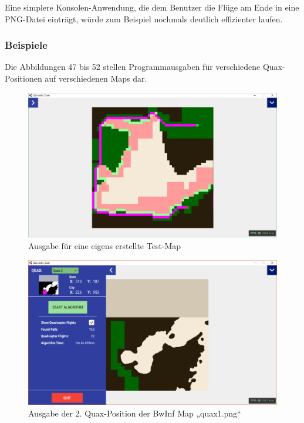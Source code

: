 \documentclass[a4paper,12pt]{article}
\begin{document}
Eine simplere Konsolen-Anwendung, die dem Benutzer die Flüge am Ende in eine PNG-Datei einträgt, würde zum Beispiel nochmals deutlich effizienter laufen.


\subsubsection{Beispiele}
Die Abbildungen 47 bis 52 stellen Programmausgaben für verschiedene Quax-Positionen auf verschiedenen Maps dar.
\begin{figure}[H]
\centering
    \includegraphics[width=1\linewidth]{Bilder/Aufgabe3/eigen_08.png}
    \caption{Ausgabe für eine eigens erstellte Test-Map}
\end{figure}
\begin{figure}[H]
\centering
    \includegraphics[width=1\linewidth]{Bilder/Aufgabe3/quax1_02.png}
    \caption{Ausgabe der 2. Quax-Position der BwInf Map „quax1.png“}
\end{figure}
\end{document}
